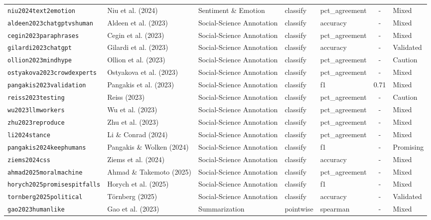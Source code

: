 \begin{longtable}{@{}l l l l l c l@{}}
\texttt{niu2024text2emotion} & Niu et al. (2024) & Sentiment \& Emotion & classify & pct\_agreement & - & Mixed \\
\texttt{aldeen2023chatgptvshuman} & Aldeen et al. (2023) & Social-Science Annotation & classify & accuracy & - & Mixed \\
\texttt{cegin2023paraphrases} & Cegin et al. (2023) & Social-Science Annotation & classify & pct\_agreement & - & Mixed \\
\texttt{gilardi2023chatgpt} & Gilardi et al. (2023) & Social-Science Annotation & classify & accuracy & - & Validated \\
\texttt{ollion2023mindhype} & Ollion et al. (2023) & Social-Science Annotation & classify & pct\_agreement & - & Caution \\
\texttt{ostyakova2023crowdexperts} & Ostyakova et al. (2023) & Social-Science Annotation & classify & pct\_agreement & - & Mixed \\
\texttt{pangakis2023validation} & Pangakis et al. (2023) & Social-Science Annotation & classify & f1 & 0.71 & Mixed \\
\texttt{reiss2023testing} & Reiss (2023) & Social-Science Annotation & classify & pct\_agreement & - & Caution \\
\texttt{wu2023llmworkers} & Wu et al. (2023) & Social-Science Annotation & classify & pct\_agreement & - & Mixed \\
\texttt{zhu2023reproduce} & Zhu et al. (2023) & Social-Science Annotation & classify & pct\_agreement & - & Mixed \\
\texttt{li2024stance} & Li \& Conrad (2024) & Social-Science Annotation & classify & pct\_agreement & - & Mixed \\
\texttt{pangakis2024keephumans} & Pangakis \& Wolken (2024) & Social-Science Annotation & classify & f1 & - & Promising \\
\texttt{ziems2024css} & Ziems et al. (2024) & Social-Science Annotation & classify & accuracy & - & Mixed \\
\texttt{ahmad2025moralmachine} & Ahmad \& Takemoto (2025) & Social-Science Annotation & classify & pct\_agreement & - & Mixed \\
\texttt{horych2025promisespitfalls} & Horych et al. (2025) & Social-Science Annotation & classify & f1 & - & Mixed \\
\texttt{tornberg2025political} & Törnberg (2025) & Social-Science Annotation & classify & accuracy & - & Validated \\
\texttt{gao2023humanlike} & Gao et al. (2023) & Summarization & pointwise & spearman & - & Mixed \\

\end{longtable}
